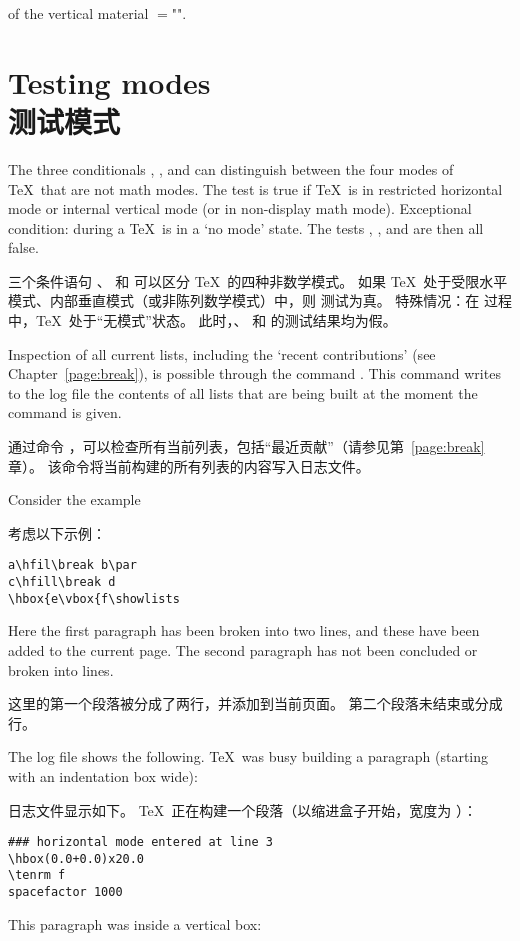 \mdqon
of the vertical material $=$""\n{-1000pt}.
\mdqoff


\section{Testing modes\\测试模式}

The three conditionals , , and
 can distinguish between the four modes of
\TeX\ that are not math modes.
The  test is true if \TeX\ is in 
restricted horizontal mode or internal vertical mode
(or in non-display math mode).
Exceptional condition: during a  \TeX\
is in a `no mode' state. The tests ,
, and  are then all false.

三个条件语句 、 和  可以区分 \TeX\ 的四种非数学模式。
如果 \TeX\ 处于受限水平模式、内部垂直模式（或非陈列数学模式）中，则 \cs{ifinner} 测试为真。
特殊情况：在  过程中，\TeX\ 处于“无模式”状态。
此时，、 和  的测试结果均为假。

Inspection of all current lists, including the `recent
contributions' (see Chapter~\ref{page:break}),
is possible through the command \label{showlists}.
This command writes to the log file the contents of all
lists that are being built at the moment the command is given.

通过命令 \label{showlists}，可以检查所有当前列表，包括“最近贡献”（请参见第~\ref{page:break} 章）。
该命令将当前构建的所有列表的内容写入日志文件。

Consider the example 

考虑以下示例：\begin{verbatim}
a\hfil\break b\par 
c\hfill\break d
\hbox{e\vbox{f\showlists
\end{verbatim}
Here the first paragraph has been broken into two lines, and
these have been added to the current page. The second paragraph
has not been concluded or broken into lines.

这里的第一个段落被分成了两行，并添加到当前页面。
第二个段落未结束或分成行。


The log file shows the following. \TeX\ was busy
building a paragraph (starting with an indentation box
\n{20pt} wide):

日志文件显示如下。
\TeX\ 正在构建一个段落（以缩进盒子开始，宽度为 \n{20pt}）：
\begin{verbatim}
### horizontal mode entered at line 3
\hbox(0.0+0.0)x20.0
\tenrm f
spacefactor 1000
\end{verbatim}
This paragraph was inside a vertical box:

